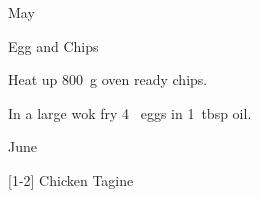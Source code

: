 \begin{menu}{May}
\begin{recipe}{1}{Egg and Chips}
\begin{ingredients}
		\end{ingredients}
	
    \begin{instructions}
    \item 
        Heat up
        800~g  oven ready chips.
      \item 
        In a large wok fry
        4~  eggs
        in
        1~tbsp  oil.
      
    \end{instructions}
    \end{recipe}%
  
    \clearpage
    \end{menu}
	
		\begin{menu}{June}
    
    \begin{recipelist}
    
        {\scriptsize[1-2]} Chicken Tagine\\
    \end{recipelist}%
    \begin{recipelist}
    
    \end{recipelist}\par%
  

\end{menu}
